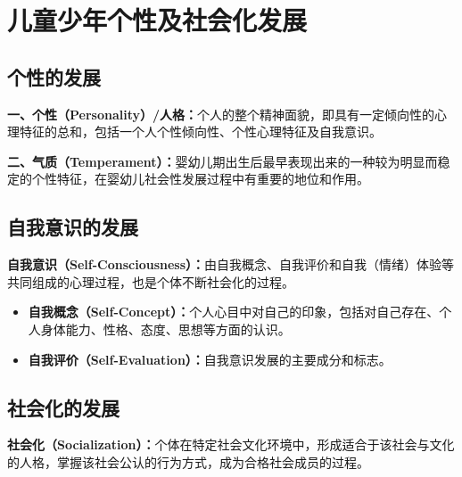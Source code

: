 \section{儿童少年个性及社会化发展}

\subsection{个性的发展}

\begin{defbox}
\textbf{一、个性（Personality）/人格：}个人的整个精神面貌，即具有一定倾向性的心理特征的总和，包括一个人个性倾向性、个性心理特征及自我意识。

\textbf{二、气质（Temperament）：}婴幼儿期出生后最早表现出来的一种较为明显而稳定的个性特征，在婴幼儿社会性发展过程中有重要的地位和作用。
\end{defbox}

\subsection{自我意识的发展}

\begin{defbox}
\textbf{自我意识（Self-Consciousness）：}由自我概念、自我评价和自我（情绪）体验等共同组成的心理过程，也是个体不断社会化的过程。

\begin{itemize}[leftmargin=*]
    \item \textbf{自我概念（Self-Concept）：}个人心目中对自己的印象，包括对自己存在、个人身体能力、性格、态度、思想等方面的认识。
    \item \textbf{自我评价（Self-Evaluation）：}自我意识发展的主要成分和标志。
\end{itemize}
\end{defbox}

\subsection{社会化的发展}

\begin{defbox}
\textbf{社会化（Socialization）：}个体在特定社会文化环境中，形成适合于该社会与文化的人格，掌握该社会公认的行为方式，成为合格社会成员的过程。
\end{defbox}

\newpage
